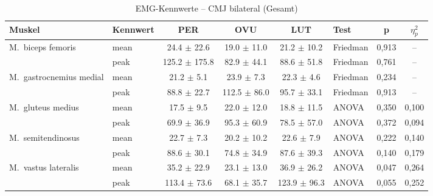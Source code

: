 
\begin{table}[H]
  \centering
  \caption{EMG-Kennwerte – CMJ bilateral (Gesamt)}
  \label{tab:CMJ_bilateral_Gesamt}
  \small
  \begin{tabular}{l l c c c l c c}
    \hline
    \textbf{Muskel} & \textbf{Kennwert} & \textbf{PER} & \textbf{OVU} & \textbf{LUT} & \textbf{Test} & \textbf{p} & \textbf{$\eta^2_p$} \\
    \hline
    M.~biceps femoris & mean & 24.4 $\pm$ 22.6 & 19.0 $\pm$ 11.0 & 21.2 $\pm$ 10.2 & Friedman & 0{,}913 & -- \\
     & peak & 125.2 $\pm$ 175.8 & 82.9 $\pm$ 44.1 & 88.6 $\pm$ 51.8 & Friedman & 0{,}761 & -- \\
    \hline
    M.~gastrocnemius medial & mean & 21.2 $\pm$ 5.1 & 23.9 $\pm$ 7.3 & 22.3 $\pm$ 4.6 & Friedman & 0{,}234 & -- \\
     & peak & 88.8 $\pm$ 22.7 & 112.5 $\pm$ 86.0 & 95.7 $\pm$ 33.1 & Friedman & 0{,}913 & -- \\
    \hline
    M.~gluteus medius & mean & 17.5 $\pm$ 9.5 & 22.0 $\pm$ 12.0 & 18.8 $\pm$ 11.5 & ANOVA & 0{,}350 & 0{,}100 \\
     & peak & 69.9 $\pm$ 36.9 & 95.3 $\pm$ 60.9 & 78.5 $\pm$ 57.0 & ANOVA & 0{,}372 & 0{,}094 \\
    \hline
    M.~semitendinosus & mean & 22.7 $\pm$ 7.3 & 20.2 $\pm$ 10.2 & 22.6 $\pm$ 7.9 & ANOVA & 0{,}222 & 0{,}140 \\
     & peak & 88.6 $\pm$ 30.1 & 74.8 $\pm$ 34.9 & 87.6 $\pm$ 39.3 & ANOVA & 0{,}140 & 0{,}179 \\
    \hline
    M.~vastus lateralis & mean & 35.2 $\pm$ 22.9 & 23.1 $\pm$ 13.0 & 36.9 $\pm$ 26.2 & ANOVA & 0{,}047 & 0{,}264 \\
     & peak & 113.4 $\pm$ 73.6 & 68.1 $\pm$ 35.7 & 123.9 $\pm$ 96.3 & ANOVA & 0{,}055 & 0{,}252 \\
    \hline
  \end{tabular}
\end{table}

